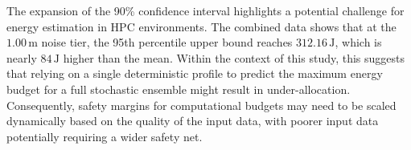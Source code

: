 The expansion of the 90\% confidence interval highlights a potential challenge for energy estimation in HPC environments. The combined data shows that at the $1.00\,\text{m}$ noise tier, the 95th percentile upper bound reaches $312.16\,\text{J}$, which is nearly $84\,\text{J}$ higher than the mean. Within the context of this study, this suggests that relying on a single deterministic profile to predict the maximum energy budget for a full stochastic ensemble might result in under-allocation. Consequently, safety margins for computational budgets may need to be scaled dynamically based on the quality of the input data, with poorer input data potentially requiring a wider safety net.
